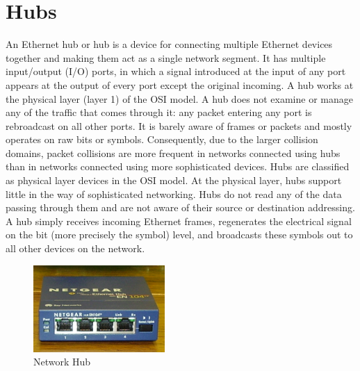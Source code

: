 \section{Hubs}
An Ethernet hub or hub is a device for connecting multiple Ethernet devices together and making them act as a single network segment. It has multiple input/output (I/O) ports, in which a signal introduced at the input of any port appears at the output of every port except the original incoming. A hub works at the physical layer (layer 1) of the OSI model.
 A hub does not examine or manage any of the traffic that comes through it: any packet entering any port is rebroadcast on all other ports.
 It is barely aware of frames or packets and mostly operates on raw bits or symbols. Consequently, due to the larger collision domains, packet collisions are more frequent in networks connected using hubs than in networks connected using more sophisticated devices.
 Hubs are classified as physical layer devices in the OSI model. At the physical layer, hubs support little in the way of sophisticated networking. Hubs do not read any of the data passing through them and are not aware of their source or destination addressing. A hub simply receives incoming Ethernet frames, regenerates the electrical signal on the bit (more precisely the symbol) level, and broadcasts these symbols out to all other devices on the network.
 \begin{figure}[htbp]
\begin{center}
	\includegraphics[width=5cm]{./Networking/ntwhardware/hub.jpg}
\caption{Network Hub}
\label{default}
\end{center}
\end{figure}
